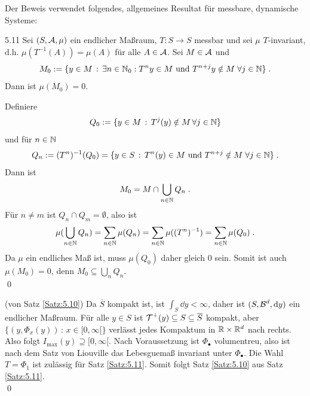 \documentclass[a4paper]{article}
\begin{document}
Der Beweis verwendet folgendes, allgemeines Resultat für messbare, dynamische Systeme:

\begin{Satz}{}{5.11}
Sei $(S,\operatorname{\mathcal{A}},\mu)$ ein endlicher Maßraum, $T\colon S\to S$ messbar und sei $\mu$ $T$-invariant, d.h. $\mu(T^{-1}(A))=\mu(A)$ für alle $A\in\operatorname{\mathcal{A}}$. Sei $M\in\operatorname{\mathcal{A}}$ und
\[M_0:=\{y\in M\,:\,\exists n\in\operatorname{\mathbb N}_0:T^ny\in M\text{ und }T^{n+j}y\notin M\;\forall j\in\operatorname{\mathbb N}\}\;.\]
Dann ist $\mu(M_0)=0$.
\end{Satz}

\begin{Beweis}
Definiere 
\[Q_0:=\{y\in M\,:\, T^j(y)\notin M\,\forall j\in\operatorname{\mathbb N}\}\]
und für $n\in\operatorname{\mathbb N}$
\[Q_n:=(T^n)^{-1}(Q_0)=\{y\in S\,:\,T^n(y)\in M\text{ und }T^{n+j}\notin M\;\forall j\in\operatorname{\mathbb N}\}\;.\]
Dann ist
\[M_0=M\cap\bigcup_{n\in\operatorname{\mathbb N}}Q_n\;.\]
Für $n\ne m$ ist $Q_n\cap Q_m=\emptyset$, also ist
\[\mu(\bigcup_{n\in\operatorname{\mathbb N}}Q_n)=\sum_{n\in\operatorname{\mathbb N}}\mu(Q_n)=\sum_{n\in\operatorname{\mathbb N}}\mu((T^n)^{-1})=\sum_{n\in\operatorname{\mathbb N}}\mu(Q_0)\;.\]
Da $\mu$ ein endliches Maß ist, muss $\mu(Q_0)$ daher gleich $0$ sein. Somit ist auch $\mu(M_0)=0$, denn $M_0\subseteq \bigcup_nQ_n$.\\\qed
\end{Beweis}

\begin{Beweis}
(von Satz \ref{Satz:5.10}) Da $\overline{S}$ kompakt ist, ist $\int_S\dd y<\infty$, daher ist $(S,\operatorname{\mathcal{B}}^d,\mathop{}\!\mathrm{d} y)$ ein endlicher Maßraum. Für alle $y\in S$ ist $\operatorname{\mathcal{T}}^+(y)\subseteq S\subseteq\overline{S}$ kompakt, aber $\{(y,\Phi_x(y))\,:\,x\in[0,\infty[\}$ verlässt jedes Kompaktum in $\mathbb R\times \mathbb R^d$ nach rechts. Also folgt $I_{\max}(y)\supseteq [0,\infty[$. Nach Voraussetzung ist $\Phi_{\bullet}$ volumentreu, also ist nach dem Satz von Liouville das Lebesguemaß invariant unter $\Phi_{\bullet}$. Die Wahl $T=\Phi_1$ ist zulässig für Satz \ref{Satz:5.11}. Somit folgt Satz \ref{Satz:5.10} aus Satz \ref{Satz:5.11}.\\\qed
\end{Beweis}
\end{document}
